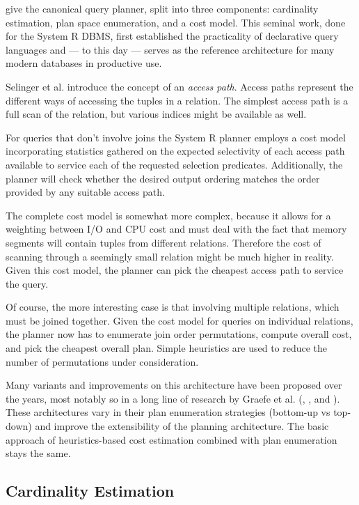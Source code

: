 \documentclass[../index.tex]{subfiles}
\begin{document}
\cite{selinger1979access} give the canonical query planner, split into
three components: cardinality estimation, plan space enumeration, and
a cost model. This seminal work, done for the System R DBMS, first
established the practicality of declarative query languages and — to
this day — serves as the reference architecture for many modern
databases in productive use.

Selinger et al. introduce the concept of an \emph{access path}. Access
paths represent the different ways of accessing the tuples in a
relation. The simplest access path is a full scan of the relation, but
various indices might be available as well.

For queries that don't involve joins the System R planner employs a
cost model incorporating statistics gathered on the expected
selectivity of each access path available to service each of the
requested selection predicates. Additionally, the planner will check
whether the desired output ordering matches the order provided by any
suitable access path.

The complete cost model is somewhat more complex, because it allows
for a weighting between I/O and CPU cost and must deal with the fact
that memory segments will contain tuples from different
relations. Therefore the cost of scanning through a seemingly small
relation might be much higher in reality. Given this cost model, the
planner can pick the cheapest access path to service the query.

Of course, the more interesting case is that involving multiple
relations, which must be joined together. Given the cost model for
queries on individual relations, the planner now has to enumerate join
order permutations, compute overall cost, and pick the cheapest
overall plan. Simple heuristics are used to reduce the number of
permutations under consideration.

Many variants and improvements on this architecture have been proposed
over the years, most notably so in a long line of research by Graefe
et al. (\cite{graefe1987exodus}, \cite{graefe1993volcano}, and
\cite{graefe1995cascades}). These architectures vary in their plan
enumeration strategies (bottom-up vs top-down) and improve the
extensibility of the planning architecture. The basic approach of
heuristics-based cost estimation combined with plan enumeration stays
the same.

\subsection{Cardinality Estimation}
\end{document}
